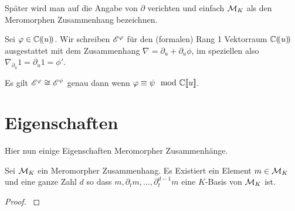 \begin{bem}
  Später wird man auf die Angabe von $\partial$ verichten und einfach $\mathcal{M}_K$
  als den Meromorphen Zusammenhang bezeichnen.
\end{bem}

\begin{defn}
  \cite[1.a]{sabbah_Fourier-local}
  Sei $\varphi\in\mathbb{C}(\!(u)\!)$.
  Wir schreiben $\mathscr{E}^\varphi$ für den (formalen) Rang 1 Vektorraum $\mathbb{C}(\!(u)\!)$
  ausgestattet mit dem Zusammenhang $\nabla=\partial_u+\partial_u\phi$, im
  speziellen also $\nabla_{\partial_u}1=\partial_u1=\phi'$.\\

\end{defn}

\begin{bem}
  \cite[1.a]{sabbah_Fourier-local}
  Es gilt $\mathscr{E}^\varphi\cong\mathscr{E}^\psi$ genau dann wenn $\varphi\equiv\psi \mod {{\mathbb C\llbracket u\rrbracket}}$.
\end{bem}

\section{Eigenschaften}
Hier nun einige Eigenschaften Meromorpher Zusammenhänge.

\begin{lem}
  \cite[Thm 4.3.3]{sabbah_cimpa90}
  \cite[Satz 4.8]{ZulaBarbara}
  Sei $\mathcal{M}_K$ ein Meromorpher Zusammenhang. Es Existiert ein Element
  $m\in\mathcal{M}_K$ und eine ganze Zahl $d$ so dass
  $m,\partial_tm,\dots,\partial_t^{d-1}m$ eine $K$-Basis von $\mathcal{M}_K$ ist.
\end{lem}
\begin{proof}
  \cite[Satz 4.8]{ZulaBarbara}
\end{proof}

